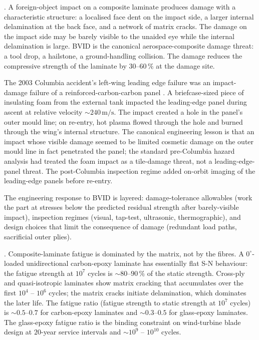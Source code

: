 . A
foreign-object impact on a composite laminate produces damage with a
characteristic structure: a localised face dent on the impact side, a
larger internal delamination at the back face, and a network of matrix
cracks. The damage on the impact side may be barely visible to the
unaided eye while the internal delamination is large. BVID is the
canonical aerospace-composite damage threat: a tool drop, a hailstone,
a ground-handling collision. The damage reduces the compressive
strength of the laminate by $30$--$60\,\%$ at the damage site.

The 2003 Columbia accident's left-wing leading edge failure was an
impact-damage failure of a reinforced-carbon-carbon panel
\cite{acc:caib-columbia}. A briefcase-sized piece of insulating foam
from the external tank impacted the leading-edge panel during ascent
at relative velocity $\sim 240\,\text{m}/\text{s}$. The impact created
a hole in the panel's outer mould line; on re-entry, hot plasma flowed
through the hole and burned through the wing's internal structure. The
canonical engineering lesson is that an impact whose visible damage
seemed to be limited cosmetic damage on the outer mould line in fact
penetrated the panel; the standard pre-Columbia hazard analysis had
treated the foam impact as a tile-damage threat, not a leading-edge-
panel threat. The post-Columbia inspection regime added on-orbit
imaging of the leading-edge panels before re-entry.

The engineering response to BVID is layered: damage-tolerance
allowables (work the part at stresses below the predicted residual
strength after barely-visible impact), inspection regimes (visual,
tap-test, ultrasonic, thermographic), and design choices that limit
the consequence of damage (redundant load paths, sacrificial outer
plies).

. Composite-laminate fatigue is
dominated by the matrix, not by the fibres. A $0^\circ$-loaded
unidirectional carbon-epoxy laminate has essentially flat S-N
behaviour: the fatigue strength at $10^7$ cycles is $\sim 80$--$90\,\%$
of the static strength. Cross-ply and quasi-isotropic laminates show
matrix cracking that accumulates over the first $10^4$ -- $10^6$ cycles;
the matrix cracks initiate delamination, which dominates the later
life. The fatigue ratio (fatigue strength to static strength at $10^7$
cycles) is $\sim 0.5$--$0.7$ for carbon-epoxy laminates and $\sim
0.3$--$0.5$ for glass-epoxy laminates. The glass-epoxy fatigue ratio is
the binding constraint on wind-turbine blade design at $20$-year
service intervals and $\sim 10^9$ -- $10^{10}$ cycles.

